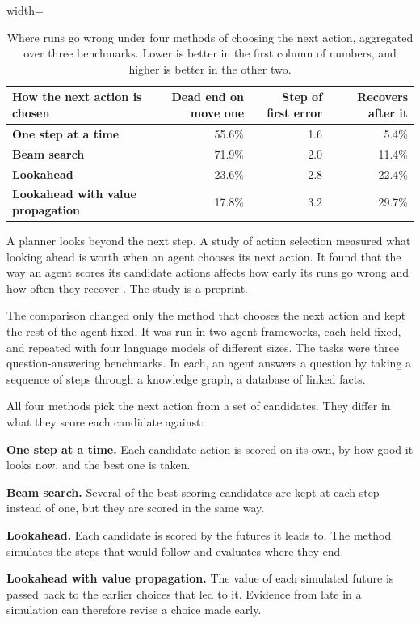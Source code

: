 \begin{table}[t]
  \caption{Where runs go wrong under four methods of choosing the next action, aggregated over three
  benchmarks. Lower is better in the first column of numbers, and higher is better in the other
  two.}
  \label{tab:planning-wang}
  \begin{adjustbox}{width=\textwidth}\begin{tabularx}{\textwidth}{Xrrr}
    \toprule
    \textbf{How the next action is chosen} & \textbf{Dead end on move one} & \textbf{Step of first
      error} & \textbf{Recovers after it} \\
    \midrule
    \textbf{One step at a time} & 55.6\% & 1.6 & 5.4\% \\
    \textbf{Beam search} & 71.9\% & 2.0 & 11.4\% \\
    \textbf{Lookahead} & 23.6\% & 2.8 & 22.4\% \\
    \textbf{Lookahead with value propagation} & 17.8\% & 3.2 & 29.7\% \\
    \bottomrule
  \end{tabularx}\end{adjustbox}
\end{table}

A planner looks beyond the next step. A study of action selection measured what looking ahead is
worth when an agent chooses its next action. It found that the way an agent scores its candidate
actions affects how early its runs go wrong and how often they recover
\citep[Table~3]{wang2026reasoningplan}. The study is a preprint.

The comparison changed only the method that chooses the next action and kept the rest of the agent
fixed. It was run in two agent frameworks, each held fixed, and
repeated with four language models of different sizes. The tasks were three question-answering
benchmarks. In each, an agent answers a question by taking a sequence of steps through a knowledge
graph, a database of linked facts.

All four methods pick the next action from a set of candidates. They differ in what they score each
candidate against:
\bi
\item \textbf{One step at a time.} Each candidate action is scored on its own, by how good it looks
now, and the best one is taken.
\item \textbf{Beam search.} Several of the best-scoring candidates are kept at each step instead of
one, but they are scored in the same way.
\item \textbf{Lookahead.} Each candidate is scored by the futures it leads to. The method simulates
the steps that would follow and evaluates where they end.
\item \textbf{Lookahead with value propagation.} The value of each simulated future is passed back to
the earlier choices that led to it. Evidence from late in a simulation can therefore revise a choice
made early.
\ei

